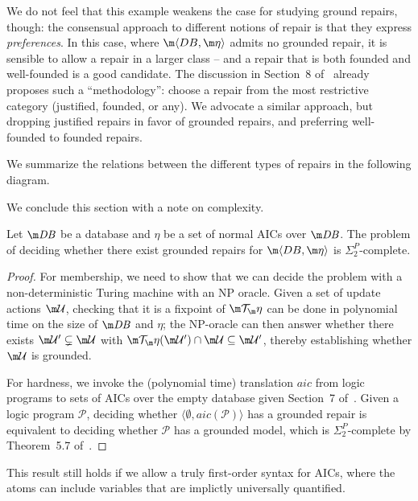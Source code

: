 We do not feel that this example weakens the case for studying ground repairs, though: the consensual approach to different notions of repair is that they express \emph{preferences}.
In this case, where $\fulldb$ admits no grounded repair, it is sensible to allow a repair in a larger class -- and a repair that is both founded and well-founded is a good candidate.
The discussion in Section~8 of~\cite{Caroprese2011} already proposes such a ``methodology'': choose a repair from the most restrictive category (justified, founded, or any).
We advocate a similar approach, but dropping justified repairs in favor of grounded repairs, and preferring well-founded to founded repairs.

We summarize the relations between the different types of repairs in the following diagram.

We conclude this section with a note on complexity.

\begin{theorem}
  \label{thm:grounded-complexity}
  Let $\db$ be a database and $\eta$ be a set of normal AICs over $\db$.
  The problem of deciding whether there exist grounded repairs for $\fulldb$ is $\Sigma^P_2$-complete.
\end{theorem}
\begin{proof}
  For membership, we need to show that we can decide the problem with a non-deterministic Turing machine with an NP oracle.
  Given a set of update actions $\UU$, checking that it is a fixpoint of $\Op$ can be done in polynomial time on the size of $\db$ and $\eta$; the NP-oracle can then answer whether there exists $\UU'\subsetneq\UU$ with $\Op(\UU')\cap\UU\subseteq\UU'$, thereby establishing whether $\UU$ is grounded.

  For hardness, we invoke the (polynomial time) translation $\mathit{aic}$ from logic programs to sets of AICs over the empty database given Section~7 of~\cite{Caroprese2011}.
  Given a logic program $\mathcal P$, deciding whether $\langle\emptyset,\mathit{aic}(\mathcal P)\rangle$ has a grounded repair is equivalent to deciding whether $\mathcal P$ has a grounded model, which is $\Sigma^P_2$-complete by Theorem~5.7 of~.
\end{proof}

This result still holds if we allow a truly first-order syntax for AICs, where the atoms can include variables that are implictly universally quantified.


